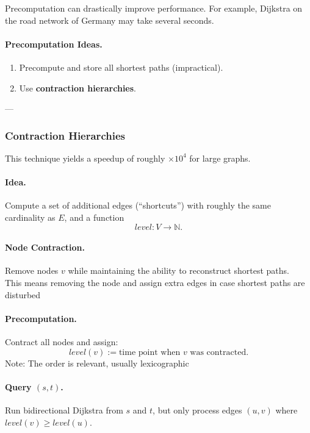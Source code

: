 \documentclass{article}
\begin{document}
Precomputation can drastically improve performance.  
For example, Dijkstra on the road network of Germany may take several seconds.

\paragraph{Precomputation Ideas.}
\begin{enumerate}
    \item Precompute and store all shortest paths (impractical).
    \item Use \textbf{contraction hierarchies}.
\end{enumerate}

---

\subsubsection{Contraction Hierarchies}

This technique yields a speedup of roughly $\times 10^4$ for large graphs.

\paragraph{Idea.}  
Compute a set of additional edges (``shortcuts'') with roughly the same cardinality as $E$, and a function
\[
level: V \to \mathbb{N}.
\]

\paragraph{Node Contraction.}  
Remove nodes $v$ while maintaining the ability to reconstruct shortest paths.\\

This means removing the node and assign extra edges in case shortest paths are disturbed
\paragraph{Precomputation.}  
Contract all nodes and assign:
\[
level(v) := \text{time point when } v \text{ was contracted.}
\]
Note: The order is relevant, usually lexicographic


\paragraph{Query $(s,t)$.}
Run bidirectional Dijkstra from $s$ and $t$, but only process edges $(u,v)$ where $level(v) \geq level(u)$.
\end{document}
